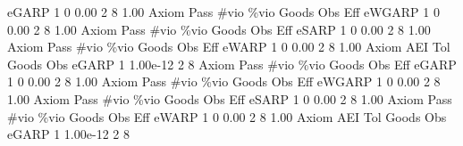       eGARP {\VBAR}    1           0        0.00           2           8        1.00  
{\smallskip}
{\smallskip}
{\smallskip}
       Axiom {\VBAR} Pass        \#vio        \%vio       Goods         Obs         Eff  
      eWGARP {\VBAR}    1           0        0.00           2           8        1.00  
{\smallskip}
{\smallskip}
{\smallskip}
       Axiom {\VBAR} Pass        \#vio        \%vio       Goods         Obs         Eff  
       eSARP {\VBAR}    1           0        0.00           2           8        1.00  
{\smallskip}
{\smallskip}
{\smallskip}
       Axiom {\VBAR} Pass        \#vio        \%vio       Goods         Obs         Eff  
       eWARP {\VBAR}    1           0        0.00           2           8        1.00  
{\smallskip}
       Axiom {\VBAR}       AEI        Tol      Goods        Obs 
       eGARP {\VBAR}         1   1.00e-12          2          8 
{\smallskip}
{\smallskip}
{\smallskip}
       Axiom {\VBAR} Pass        \#vio        \%vio       Goods         Obs         Eff  
       eGARP {\VBAR}    1           0        0.00           2           8        1.00  
{\smallskip}
{\smallskip}
{\smallskip}
       Axiom {\VBAR} Pass        \#vio        \%vio       Goods         Obs         Eff  
      eWGARP {\VBAR}    1           0        0.00           2           8        1.00  
{\smallskip}
{\smallskip}
{\smallskip}
       Axiom {\VBAR} Pass        \#vio        \%vio       Goods         Obs         Eff  
       eSARP {\VBAR}    1           0        0.00           2           8        1.00  
{\smallskip}
{\smallskip}
{\smallskip}
       Axiom {\VBAR} Pass        \#vio        \%vio       Goods         Obs         Eff  
       eWARP {\VBAR}    1           0        0.00           2           8        1.00  
{\smallskip}
       Axiom {\VBAR}       AEI        Tol      Goods        Obs 
       eGARP {\VBAR}         1   1.00e-12          2          8 
{\smallskip}
{\smallskip}
{\smallskip}
